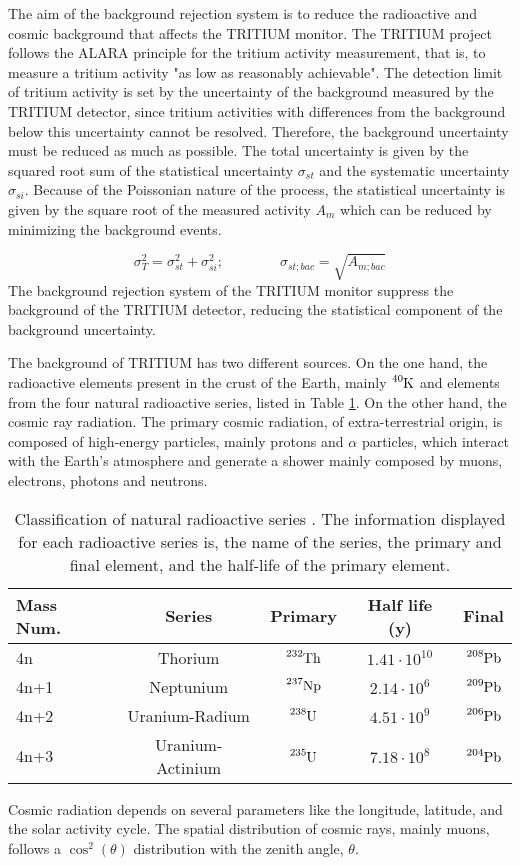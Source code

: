 The aim of the background rejection system is to reduce the radioactive and cosmic background that affects the TRITIUM monitor. The TRITIUM project follows the ALARA principle for the tritium activity measurement, that is, to measure a tritium activity "as low as reasonably achievable". The detection limit of tritium activity is set by the uncertainty of the background measured by the TRITIUM detector, since tritium activities with differences from the background below this uncertainty cannot be resolved. Therefore, the background uncertainty must be reduced as much as possible. The total uncertainty is given by the squared root sum of the statistical uncertainty $\sigma_{st}$ and the systematic uncertainty $\sigma_{si}$. Because of the Poissonian nature of the process, the statistical uncertainty is given by the square root of the measured activity $A_{m}$ which can be reduced by minimizing the background events.

\begin{equation}
\sigma_{T}^2 = \sigma_{st}^2 +\sigma_{si}^2; \qquad \qquad \sigma_{st;bac} = \sqrt{A_{m;bac}}
\label{eq:SquareSumUncerainty}
\end{equation} 
The background rejection system of the TRITIUM monitor suppress the background of the TRITIUM detector, reducing the statistical component of the background uncertainty.

The background of TRITIUM has two different sources. On the one hand, the radioactive elements present in the crust of the Earth, mainly $\ce{^{40}K}$ and elements from the four natural radioactive series, listed in Table \ref{tab:NaturalRadioactiveSeries}. On the other hand, the cosmic ray radiation. The primary cosmic radiation, of extra-terrestrial origin, is composed of high-energy particles, mainly protons and $\alpha$ particles, which interact with the Earth's atmosphere and generate a shower mainly composed by muons, electrons, photons and neutrons.

\begin{table}[htbp]
\centering{}%
\begin{tabular}{lcccc}
\toprule 
Mass Num. & Series & Primary & Half life (y) & Final \tabularnewline
\midrule
\midrule 
4n & Thorium & $\ce{^{232}Th}$ & $1.41 \cdot{} 10^{10}$ & $\ce{^{208}Pb}$ \tabularnewline
4n+1 & Neptunium & $\ce{^{237}Np}$ & $2.14 \cdot{} 10^{6}$ & $\ce{^{209}Pb}$ \tabularnewline
4n+2 & Uranium-Radium & $\ce{^{238}U}$ & $4.51 \cdot{} 10^{9}$ & $\ce{^{206}Pb}$ \tabularnewline
4n+3 & Uranium-Actinium & $\ce{^{235}U}$ & $7.18 \cdot{} 10^{8}$ & $\ce{^{204}Pb}$ \tabularnewline
\bottomrule
\end{tabular}
\caption{Classification of natural radioactive series \cite{NaturalRadioactiveSeries1, NaturalRadioactiveSeries2}. The information displayed for each radioactive series is, the name of the series, the primary and final element, and the half-life of the primary element.}
\label{tab:NaturalRadioactiveSeries}
\end{table}
Cosmic radiation depends on several parameters like the longitude, latitude, and the solar activity cycle. The spatial distribution of cosmic rays, mainly muons, follows a $\cos^2(\theta)$ distribution with the zenith angle, $\theta$. 

